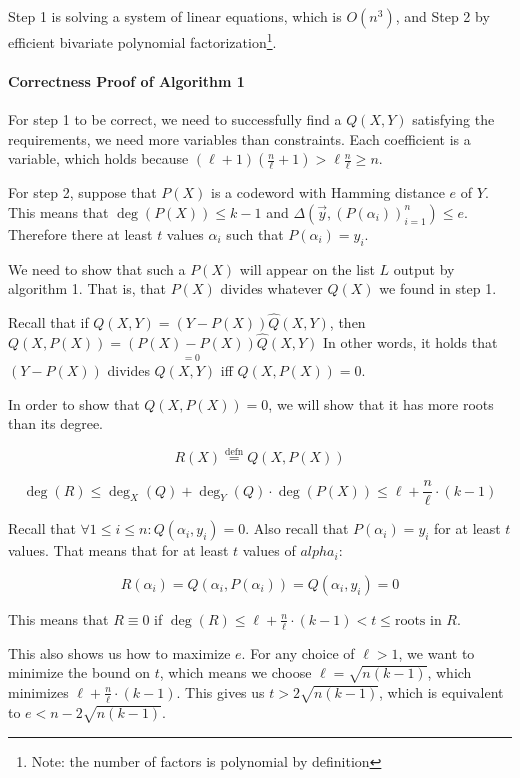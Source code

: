 \documentclass{idc_msc}
\begin{document}
Step 1 is solving a system of linear equations, which is \(O(n^3)\), and Step 2 by efficient bivariate polynomial factorization\footnote{Note: the number of factors is polynomial by definition}.

\paragraph{Correctness Proof of Algorithm 1}

For step 1 to be correct, we need to successfully find a \(Q(X,Y)\) satisfying the requirements, we need more variables than constraints.
Each coefficient is a variable, which holds because \((\ell + 1)(\frac{n}{\ell}+1) > \ell \frac{n}{\ell} \ge n\).

For step 2, suppose that \(P(X)\) is a codeword with Hamming distance \(e\) of \(Y\).
This means that \(\deg(P(X)) \le k-1\) and \(\Delta(\vec{y}, (P(\alpha_i))^n_{i=1}) \le e\).
Therefore there at least \(t\) values \(\alpha_i\) such that \(P(\alpha_i) = y_i\).

We need to show that such a \(P(X)\) will appear on the list \(L\) output by algorithm 1.
That is, that \(P(X)\) divides whatever \(Q(X)\) we found in step 1.

Recall that if \(Q(X,Y) = (Y - P(X)) \hat{Q}(X,Y)\), then \(Q(X, P(X)) = \underset{=0}{(P(X) - P(X))}\hat{Q}(X,Y)\)
In other words, it holds that \((Y - P(X))\) divides \(Q(X,Y)\) iff \(Q(X,P(X)) = 0\).

In order to show that \(Q(X, P(X)) = 0\), we will show that it has more roots than its degree.

\[R(X) \overset{\text{defn}}{=}Q(X, P(X))\]

\[\deg(R) \le \deg_X(Q) + \deg_Y(Q) \cdot \deg(P(X)) \le \ell + \frac{n}{\ell} \cdot (k - 1)\]

Recall that \(\forall 1 \le i \le n : Q(\alpha_i, y_i) = 0\).
Also recall that \(P(\alpha_i) = y_i\) for at least \(t\) values.
That means that for at least \(t\) values of \(alpha_i\):

\[R(\alpha_i) = Q(\alpha_i, P(\alpha_i)) = Q(\alpha_i, y_i) = 0\]

This means that \(R \equiv 0\) if \(\deg(R) \le \ell + \frac{n}{\ell} \cdot (k - 1) < t \le \text{roots in }R\).

This also shows us how to maximize \(e\).
For any choice of \(\ell > 1\), we want to minimize the bound on \(t\), which means we choose \(\ell = \sqrt{n(k-1)}\), which minimizes \(\ell + \frac{n}{\ell} \cdot (k - 1)\).
This gives us \(t > 2 \sqrt{n(k-1)}\), which is equivalent to \(e < n - 2\sqrt{n(k-1)}\).
\end{document}
